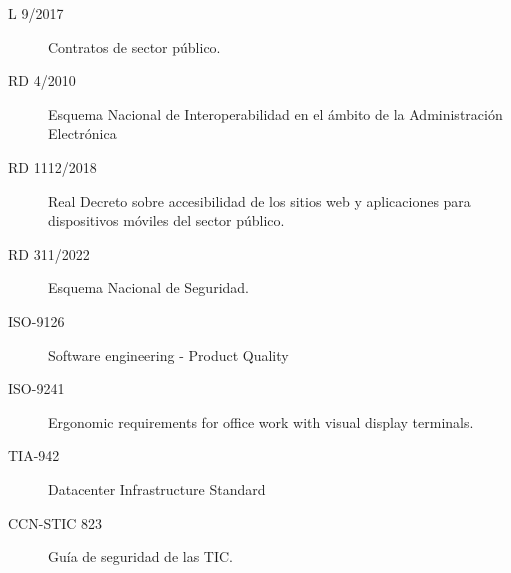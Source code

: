 \begin{description}
        \item[L  9/2017] Contratos de sector público.
        \item[RD    4/2010] Esquema Nacional de Interoperabilidad en el ámbito de la Administración Electrónica
        \item[RD 1112/2018] Real Decreto sobre accesibilidad de los sitios web y aplicaciones para dispositivos móviles del sector público.
        \item[RD  311/2022] Esquema Nacional de Seguridad. 
        \item[ISO-9126] Software engineering - Product Quality
        \item[ISO-9241] Ergonomic requirements for office work with visual display terminals.
        \item[TIA-942] Datacenter Infrastructure Standard
        \item[CCN-STIC 823] Guía de seguridad de las TIC. 

    \end{description}